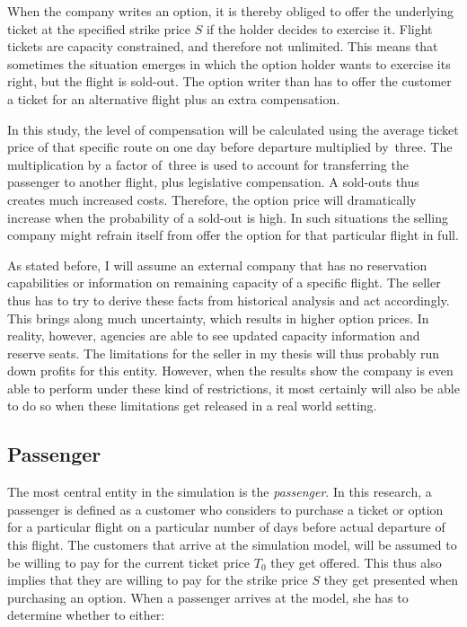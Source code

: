 When the company writes an option, it is thereby obliged to offer the underlying ticket at the specified strike price $S$ if the holder decides to exercise it. Flight tickets are capacity constrained, and therefore not unlimited. This means that sometimes the situation emerges in which the option holder wants to exercise its right, but the flight is sold-out. The option writer than has to offer the customer a ticket for an alternative flight plus an extra compensation.

In this study, the level of compensation will be calculated using the average ticket price of that specific route on one day before departure multiplied by~three. The multiplication by a factor of~three is used to account for transferring the passenger to another flight, plus legislative compensation. A sold-outs thus creates much increased costs. Therefore, the option price will dramatically increase when the probability of a sold-out is high. In such situations the selling company might refrain itself from offer the option for that particular flight in full.

As stated before, I will assume an external company that has no reservation capabilities or information on remaining capacity of a specific flight. The seller thus has to try to derive these facts from historical analysis and act accordingly. This brings along much uncertainty, which results in higher option prices. In reality, however, agencies are able to see updated capacity information and reserve seats. The limitations for the seller in my thesis will thus probably run down profits for this entity. However, when the results show the company is even able to perform under these kind of restrictions, it most certainly will also be able to do so when these limitations get released in a real world setting.


\subsection{Passenger}
\label{sec:Passenger}
The most central entity in the simulation is the \emph{passenger}. In this research, a passenger is defined as a customer who considers to purchase a ticket or option for a particular flight on a particular number of days before actual departure of this flight. The customers that arrive at the simulation model, will be assumed to be willing to pay for the current ticket price $T_0$ they get offered. This thus also implies that they are willing to pay for the strike price $S$ they get presented when purchasing an option. When a passenger arrives at the model, she has to determine whether to either:

